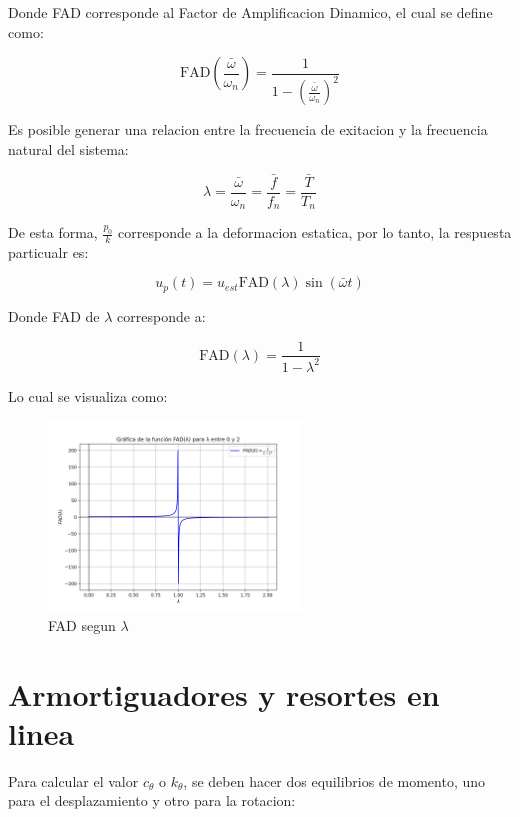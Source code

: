 \documentclass{article}  %
\begin{document}
Donde FAD corresponde al Factor de Amplificacion Dinamico, el cual se define como:

\begin{equation}
    \text{FAD}(\frac{\bar\omega}{\omega_n}) = \frac{1}{1-(\frac{\bar{\omega}}{\omega_n})^2}
\end{equation}

Es posible generar una relacion entre la frecuencia de exitacion y la frecuencia natural del sistema:

\begin{equation}
    \lambda = \frac{\bar{\omega}}{\omega_n} = \frac{\bar{f}}{f_n} = \frac{\bar{T}}{T_n}
\end{equation}

De esta forma, $\frac{p_0}{k}$ corresponde a la deformacion estatica, por lo tanto, la respuesta particualr es:

\begin{equation}
    u_p(t) = u_{est} \text{FAD}(\lambda) \sin(\bar{\omega} t)
\end{equation}

Donde FAD de $\lambda$ corresponde a:

\begin{equation}
    \text{FAD}(\lambda) = \frac{1}{1-\lambda^2}
\end{equation}

Lo cual se visualiza como:

\begin{figure}[H]
    \centering
    \includegraphics[width=0.6\textwidth]{GRAFICOS/FAD.png}
    \caption{FAD segun $\lambda$}
    \label{fig:ejemplo1}
\end{figure}

\section{Armortiguadores y resortes en linea}

Para calcular el valor $c_\theta$ o $k_\theta$, se deben hacer dos equilibrios de momento, uno para el desplazamiento y otro para la rotacion:
\end{document}
